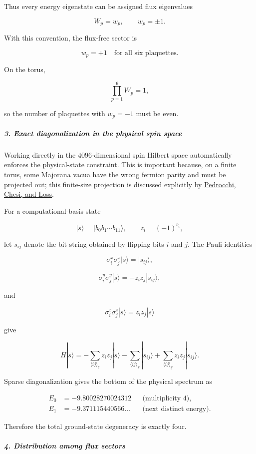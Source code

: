 Thus every energy eigenstate can be assigned flux eigenvalues

\[
W_p=w_p,\qquad w_p=\pm1.
\]

With this convention, the flux-free sector is

\[
w_p=+1\quad\text{for all six plaquettes}.
\]

On the torus,

\[
\prod_{p=1}^{6}W_p=1,
\]

so the number of plaquettes with $w_p=-1$ must be even.

\subparagraph*{3. Exact diagonalization in the physical spin space}

Working directly in the $4096$-dimensional spin Hilbert space automatically enforces the physical-state constraint. This is important because, on a finite torus, some Majorana vacua have the wrong fermion parity and must be projected out; this finite-size projection is discussed explicitly by \href{\detokenize{https://arxiv.org/abs/1105.4573}}{Pedrocchi, Chesi, and Loss}.

For a computational-basis state

\[
|s\rangle=|b_0b_1\cdots b_{11}\rangle,\qquad z_i=(-1)^{b_i},
\]

let $s_{ij}$ denote the bit string obtained by flipping bits $i$ and $j$. The Pauli identities

\[
\sigma_i^x\sigma_j^x|s\rangle=|s_{ij}\rangle,
\]

\[
\sigma_i^y\sigma_j^y|s\rangle=-z_i z_j|s_{ij}\rangle,
\]

and

\[
\sigma_i^z\sigma_j^z|s\rangle=z_i z_j|s\rangle
\]

give

\[
H|s\rangle = -\sum_{\langle ij\rangle_z}z_i z_j|s\rangle -\sum_{\langle ij\rangle_x}|s_{ij}\rangle +\sum_{\langle ij\rangle_y}z_i z_j|s_{ij}\rangle.
\]

Sparse diagonalization gives the bottom of the physical spectrum as

\[
\begin{aligned}
E_0&=-9.80028270024312
&&\text{(multiplicity $4$)},\\
E_1&=-9.371115440566\ldots
&&\text{(next distinct energy)}.
\end{aligned}
\]

Therefore the total ground-state degeneracy is exactly four.

\subparagraph*{4. Distribution among flux sectors}

